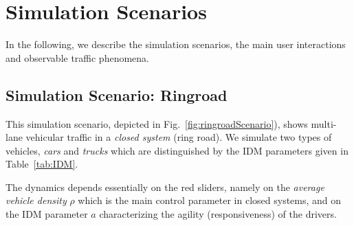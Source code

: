 \documentclass[paper=A4,pagesize=auto,11pt]{scrartcl}
\begin{document}
\section{Simulation Scenarios}

In the following, we describe the simulation scenarios, the main user interactions and observable traffic phenomena.

\subsection{Simulation Scenario: Ringroad}\label{sec:ringroad}
This simulation scenario, depicted in
Fig.~\ref{fig:ringroadScenario}), shows multi-lane vehicular traffic in a
\textit{closed system} (ring road). We simulate two types of
vehicles, \textit{cars} and \textit{trucks} which are distinguished by
the IDM parameters given in Table~\ref{tab:IDM}. 

The dynamics depends essentially on the red sliders, namely on the
\textit{average vehicle density} $\rho$ which is the main control
parameter in closed systems, and on the IDM parameter $a$
characterizing the agility (responsiveness) of the drivers. 
\end{document}
